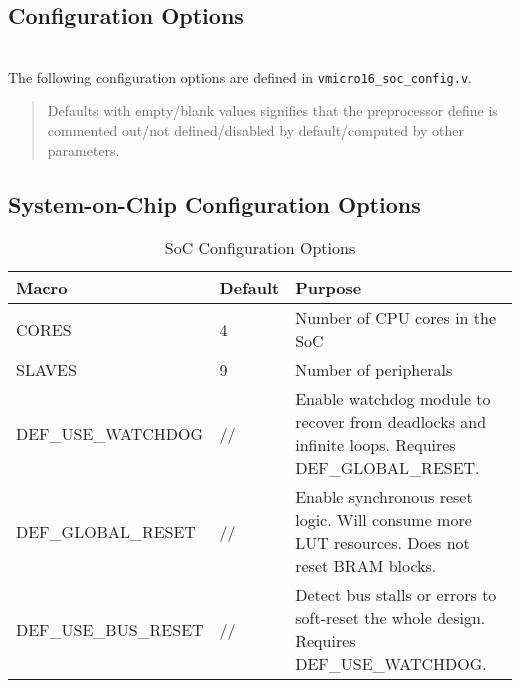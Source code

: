 \begin{appendices}
\chapter{Configuration Options}
\label{sect:config}
\startcontents[chapters]

\noindent\\
The following configuration options are defined in \verb|vmicro16_soc_config.v|.

\begin{quote}
Defaults with empty/blank values signifies that the preprocessor define is commented out/not defined/disabled by default/computed by other parameters.
\end{quote}

\section{System-on-Chip Configuration Options}
\begin{table}[H]
\centering
\begin{tabularx}{\textwidth}{l|l|p{8cm}}
Macro      & Default & Purpose                         \\ 
\hline
CORES  & 4       & Number of CPU cores in the SoC  \\
SLAVES & 9       & Number of peripherals  \\    
DEF\_USE\_WATCHDOG & //  & Enable watchdog module to recover from deadlocks and infinite loops. Requires DEF\_GLOBAL\_RESET. \\
DEF\_GLOBAL\_RESET           & //      & Enable synchronous reset logic. Will consume more LUT resources. Does not reset BRAM blocks.\\
DEF\_USE\_BUS\_RESET & //      & Detect bus stalls or errors to soft-reset the whole design. Requires DEF\_USE\_WATCHDOG.\\
\end{tabularx}
\caption{SoC Configuration Options}
\end{table}


\end{appendices}
